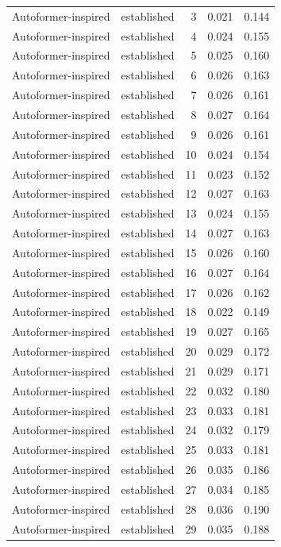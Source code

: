 \begin{tabular}{llrrr}
Autoformer-inspired & established & 3 & 0.021 & 0.144 \\
Autoformer-inspired & established & 4 & 0.024 & 0.155 \\
Autoformer-inspired & established & 5 & 0.025 & 0.160 \\
Autoformer-inspired & established & 6 & 0.026 & 0.163 \\
Autoformer-inspired & established & 7 & 0.026 & 0.161 \\
Autoformer-inspired & established & 8 & 0.027 & 0.164 \\
Autoformer-inspired & established & 9 & 0.026 & 0.161 \\
Autoformer-inspired & established & 10 & 0.024 & 0.154 \\
Autoformer-inspired & established & 11 & 0.023 & 0.152 \\
Autoformer-inspired & established & 12 & 0.027 & 0.163 \\
Autoformer-inspired & established & 13 & 0.024 & 0.155 \\
Autoformer-inspired & established & 14 & 0.027 & 0.163 \\
Autoformer-inspired & established & 15 & 0.026 & 0.160 \\
Autoformer-inspired & established & 16 & 0.027 & 0.164 \\
Autoformer-inspired & established & 17 & 0.026 & 0.162 \\
Autoformer-inspired & established & 18 & 0.022 & 0.149 \\
Autoformer-inspired & established & 19 & 0.027 & 0.165 \\
Autoformer-inspired & established & 20 & 0.029 & 0.172 \\
Autoformer-inspired & established & 21 & 0.029 & 0.171 \\
Autoformer-inspired & established & 22 & 0.032 & 0.180 \\
Autoformer-inspired & established & 23 & 0.033 & 0.181 \\
Autoformer-inspired & established & 24 & 0.032 & 0.179 \\
Autoformer-inspired & established & 25 & 0.033 & 0.181 \\
Autoformer-inspired & established & 26 & 0.035 & 0.186 \\
Autoformer-inspired & established & 27 & 0.034 & 0.185 \\
Autoformer-inspired & established & 28 & 0.036 & 0.190 \\
Autoformer-inspired & established & 29 & 0.035 & 0.188 \\

\end{tabular}
